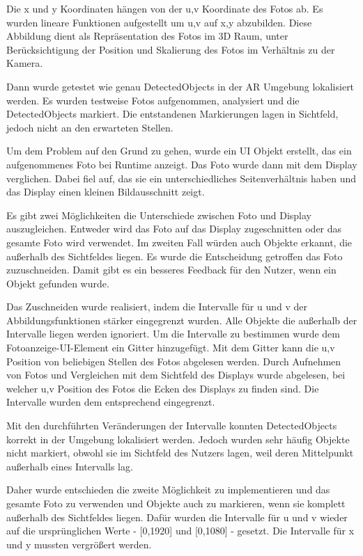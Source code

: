 Die x und y Koordinaten hängen von der u,v Koordinate des Fotos ab. Es wurden lineare Funktionen aufgestellt um u,v auf x,y abzubilden. Diese Abbildung dient als Repräsentation des Fotos im 3D Raum, unter Berücksichtigung der Position und Skalierung des Fotos im Verhältnis zu der Kamera.

Dann wurde getestet wie genau DetectedObjects in der AR Umgebung lokalisiert werden. Es wurden testweise Fotos aufgenommen, analysiert und die DetectedObjects markiert. Die entstandenen Markierungen lagen in Sichtfeld, jedoch nicht an den erwarteten Stellen. 

Um dem Problem auf den Grund zu gehen, wurde ein UI Objekt erstellt, das ein aufgenommenes Foto bei Runtime anzeigt.
Das Foto wurde dann mit dem Display verglichen. Dabei fiel auf, das sie ein unterschiedliches Seitenverhältnis haben und das Display einen kleinen Bildausschnitt zeigt.  

Es gibt zwei Möglichkeiten die Unterschiede zwischen Foto und Display auszugleichen. Entweder wird das Foto auf das Display zugeschnitten oder das gesamte Foto wird verwendet. Im zweiten Fall würden auch Objekte erkannt, die außerhalb des Sichtfeldes liegen.
Es wurde die Entscheidung getroffen das Foto zuzuschneiden. Damit gibt es ein besseres Feedback für den Nutzer, wenn ein Objekt gefunden wurde. 

Das Zuschneiden wurde realisiert, indem die Intervalle für u und v der Abbildungsfunktionen stärker eingegrenzt wurden. Alle Objekte die außerhalb der Intervalle liegen werden ignoriert. Um die Intervalle zu bestimmen wurde dem Fotoanzeige-UI-Element ein Gitter hinzugefügt. Mit dem Gitter kann die u,v Position von beliebigen Stellen des Fotos abgelesen werden. 
Durch Aufnehmen von Fotos und Vergleichen mit dem Sichtfeld des Displays wurde abgelesen, bei welcher u,v Position des Fotos die Ecken des Displays zu finden sind. Die Intervalle wurden dem entsprechend eingegrenzt. 

Mit den durchführten Veränderungen der Intervalle konnten DetectedObjects korrekt in der Umgebung lokalisiert werden. Jedoch wurden sehr häufig Objekte nicht markiert, obwohl sie im Sichtfeld des Nutzers lagen, weil deren Mittelpunkt außerhalb eines Intervalls lag.

Daher wurde entschieden die zweite Möglichkeit zu implementieren und das gesamte Foto zu verwenden und Objekte auch zu markieren, wenn sie komplett außerhalb des Sichtfeldes liegen. 
Dafür wurden die Intervalle für u und v wieder auf die ursprünglichen Werte - [0,1920] und [0,1080] - gesetzt. Die Intervalle für x und y mussten vergrößert werden.

